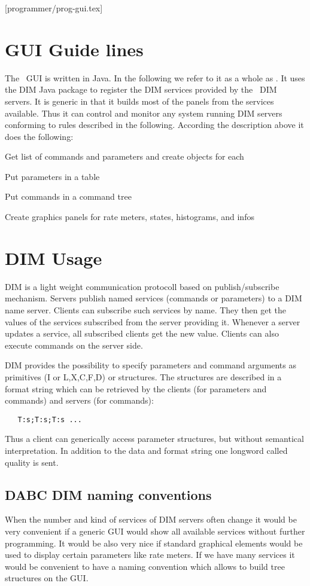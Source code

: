 [programmer/prog-gui.tex]
\section{GUI Guide lines}
The \dabc~GUI is written in Java. In the following we refer to it
as a whole as \gui. It uses the DIM Java package to register the
DIM services provided by the \dabc~DIM servers. It is generic in that it
builds most of the panels from the services available.
Thus it can control and monitor any system running DIM servers conforming to
rules described in the following. 
According the description above it does the following:
\begin{compactitem}[$\bullet$]
\item Get list of commands and parameters and create objects for each
\item Put parameters in a table
\item Put commands in a command tree
\item Create graphics panels for rate meters, states, histograms, and infos
\end{compactitem}

\section{DIM Usage}
DIM is a light weight communication protocoll based on publish/subscribe mechanism. Servers publish named services (commands or parameters) to a DIM name server. Clients can subscribe such services by name. They then get the values of the services subscribed from the server providing it. Whenever a server updates a service, all subscribed clients get the new value. Clients can also execute commands on the server side.

DIM provides the possibility to specify parameters and command arguments as primitives (I or L,X,C,F,D) or structures. The structures are described in a format string which can be retrieved by the clients (for parameters and commands) and servers (for commands):
\begin{verbatim}
   T:s;T:s;T:s ...
\end{verbatim}
Thus a client can generically access parameter structures, but without semantical interpretation.
In addition to the data and format string one longword called quality is sent.

\subsection{DABC DIM naming conventions}
When the number and kind of services of DIM servers often change it would be very convenient if a generic GUI would show all available services without further programming. It would be also very nice if standard graphical elements would be used to display certain parameters like rate meters. If we have many services it would be convenient to have a naming convention which allows to build tree structures on the GUI.

